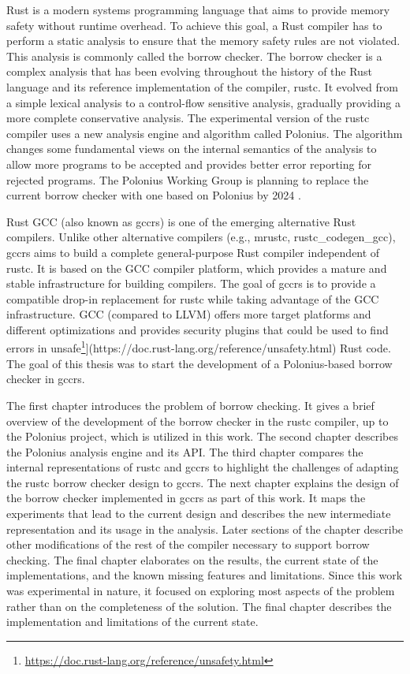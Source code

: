 \documentclass[
  11pt,
  twoside,symmetric]{report}
\DeclareRobustCommand{\href}[2]{#2\footnote{\url{#1}}}
\begin{document}
Rust is a modern systems programming language that aims to provide
memory safety without runtime
overhead. To achieve this goal, a
Rust compiler has to perform a static analysis to ensure that the memory
safety rules are not violated. This analysis is commonly called the
borrow checker. The borrow checker is a complex analysis that has been
evolving throughout the history of the Rust language and its reference
implementation of the compiler, rustc. It evolved from a simple lexical
analysis to a control-flow sensitive analysis, gradually providing a
more complete conservative analysis. The experimental version of the
rustc compiler uses a new analysis engine and algorithm called Polonius.
The algorithm changes some fundamental views on the internal semantics
of the analysis to allow more programs to be accepted and provides
better error reporting for rejected
programs. The Polonius Working Group is
planning to replace the current borrow checker with one based on
Polonius by 2024 .

Rust GCC (also known as gccrs) is one of the emerging alternative Rust
compilers. Unlike other alternative compilers (e.g., mrustc,
rustc\_codegen\_gcc), gccrs aims to build a complete general-purpose
Rust compiler independent of rustc. It is based on the GCC compiler
platform, which provides a mature and stable infrastructure for building
compilers. The goal of gccrs is to provide a compatible drop-in
replacement for rustc while taking advantage of the GCC infrastructure.
GCC (compared to LLVM) offers more target platforms and different
optimizations and provides security plugins that could be used to find
errors in
\href{https://doc.rust-lang.org/reference/unsafety.html}{unsafe}{]}(https://doc.rust-lang.org/reference/unsafety.html)
Rust code. The goal of this thesis was
to start the development of a Polonius-based borrow checker in gccrs.

The first chapter introduces the problem of borrow checking. It gives a
brief overview of the development of the borrow checker in the rustc
compiler, up to the Polonius project, which is utilized in this work.
The second chapter describes the Polonius analysis engine and its API.
The third chapter compares the internal representations of rustc and
gccrs to highlight the challenges of adapting the rustc borrow checker
design to gccrs. The next chapter explains the design of the borrow
checker implemented in gccrs as part of this work. It maps the
experiments that lead to the current design and describes the new
intermediate representation and its usage in the analysis. Later
sections of the chapter describe other modifications of the rest of the
compiler necessary to support borrow checking. The final chapter
elaborates on the results, the current state of the implementations, and
the known missing features and limitations. Since this work was
experimental in nature, it focused on exploring most aspects of the
problem rather than on the completeness of the solution. The final
chapter describes the implementation and limitations of the current
state.
\end{document}
